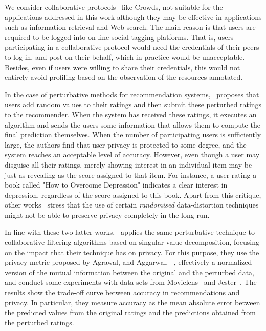 We consider collaborative protocols~\cite{Domingo09DKE,Rebollo09COMCOM,Domingo12INS} like Crowds, not suitable for the applications addressed in this work although they may be effective in applications such as information retrieval and Web search. The main reason is that users are required to be logged into on-line social tagging platforms. That is, users participating in a collaborative protocol would need the credentials of their peers to log in, and post on their behalf, which in practice would be unacceptable. Besides, even if users were willing to share their credentials, this would not entirely avoid profiling based on the observation of the resources annotated.

In the case of perturbative methods for recommendation systems, \cite{Polat03SDM}~proposes that users add random values to their ratings and then submit these perturbed ratings to the recommender. When the system has received these ratings, it executes an algorithm and sends the users some information that allows them to compute the final prediction themselves. When the number of participating users is sufficiently large, the authors find that user privacy is protected to some degree, and the system reaches an acceptable level of accuracy. However, even though a user may disguise all their ratings, merely showing interest in an individual item may be just as revealing as the score assigned to that item. For instance, a user rating a book called "How to Overcome Depression" indicates a clear interest in depression, regardless of the score assigned to this book. Apart from this critique, other works~\cite{Kargupta03ICDM,Huang05SIGMOD} stress that the use of certain \emph{randomised} data-distortion techniques might not be able to preserve privacy completely in the long run.

In line with these two latter works, \cite{Polat05SAC}~applies the same perturbative technique to collaborative filtering algorithms based on singular-value decomposition, focusing on the impact that their technique has on privacy. For this purpose, they use the privacy metric proposed by Agrawal, and Aggarwal, ~\cite{Agrawal01SIGMOD}, effectively a normalized version of the mutual information between the original and the perturbed data, and conduct some experiments with data sets from Movielens~\cite{Movielens} and Jester~\cite{Jester}. The results show the trade-off curve between accuracy in recommendations and privacy. In particular, they measure accuracy as the mean
absolute error between the predicted values from the original ratings and the predictions obtained from the perturbed ratings.

